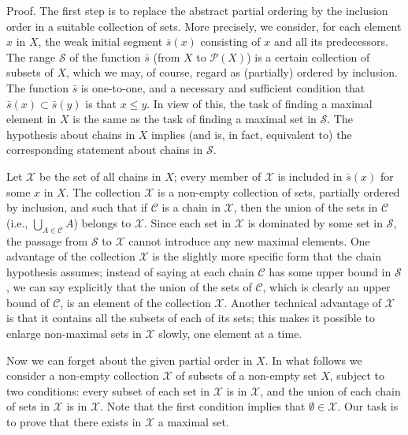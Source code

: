 Proof. The first step is to replace the abstract partial ordering by the inclusion order in a suitable collection of sets. More precisely, we consider, for each element $x$ in $X$, the weak initial segment $\bar{s}(x)$ consisting of $x$ and all its predecessors. The range $\mathcal{S}$ of the function $\bar{s}$ (from $X$ to $\mathcal{P}(X)$) is a certain collection of subsets of $X$, which we may, of course, regard as (partially) ordered by inclusion. The function $\bar{s}$ is one-to-one, and a necessary and sufficient condition that $\bar{s}(x) \subset \bar{s}(y)$ is that $x \le y$. In view of this, the task of finding a maximal element in $X$ is the same as the task of finding a maximal set in $\mathcal{S}$. The hypothesis about chains in $X$ implies (and is, in fact, equivalent to) the corresponding statement about chains in $\mathcal{S}$. 

Let $\mathcal{X}$ be the set of all chains in $X$; every member of $\mathcal{X}$ is included in $\bar{s}(x)$ for some $x$ in $X$. The collection $\mathcal{X}$ is a non-empty collection of sets, partially ordered by inclusion, and such that if $\mathcal{C}$ is a chain in $\mathcal{X}$, then the union of the sets in $\mathcal{C}$ (i.e., $\bigcup_{A \in \mathcal{C}} A$) belongs to $\mathcal{X}$. Since each set in $\mathcal{X}$ is dominated by some set in $\mathcal{S}$, the passage from $\mathcal{S}$ to $\mathcal{X}$ cannot introduce any new maximal elements. One advantage of the collection $\mathcal{X}$ is the slightly more specific form that the chain hypothesis assumes; instead of saying at each chain $\mathcal{C}$ has some upper bound in $\mathcal{S}$, we can say explicitly that the union of the sets of $\mathcal{C}$, which is clearly an upper bound of $\mathcal{C}$, is an element of the collection $\mathcal{X}$. Another technical advantage of $\mathcal{X}$ is that it contains all the subsets of each of its sets; this makes it possible to enlarge non-maximal sets in $\mathcal{X}$ slowly, one element at a time. 

Now we can forget about the given partial order in $X$. In what follows we consider a non-empty collection $\mathcal{X}$ of subsets of a non-empty set $X$, subject to two conditions: every subset of each set in $\mathcal{X}$ is in $\mathcal{X}$, and the union of each chain of sets in $\mathcal{X}$ is in $\mathcal{X}$. Note that the first condition implies that $\emptyset \in \mathcal{X}$. Our task is to prove that there exists in $\mathcal{X}$ a maximal set. 

